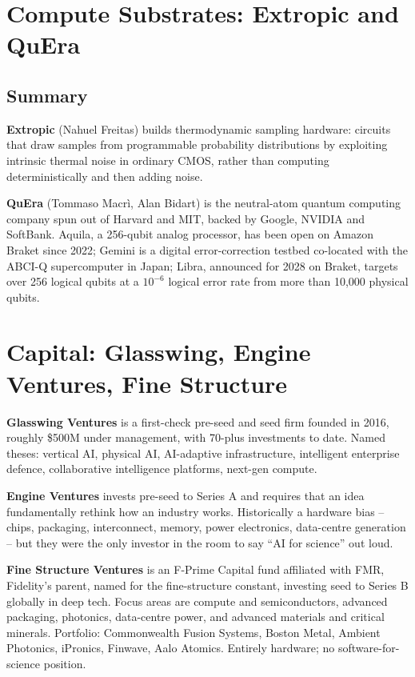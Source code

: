 \documentclass[11pt]{article}
\begin{document}
\section{Compute Substrates: Extropic and QuEra}

\subsection*{Summary}
\textbf{Extropic} (Nahuel Freitas) builds thermodynamic sampling hardware: circuits that draw samples from programmable probability distributions by exploiting intrinsic thermal noise in ordinary CMOS, rather than computing deterministically and then adding noise.

\textbf{QuEra} (Tommaso Macrì, Alan Bidart) is the neutral-atom quantum computing company spun out of Harvard and MIT, backed by Google, NVIDIA and SoftBank. Aquila, a 256-qubit analog processor, has been open on Amazon Braket since 2022; Gemini is a digital error-correction testbed co-located with the ABCI-Q supercomputer in Japan; Libra, announced for 2028 on Braket, targets over 256 logical qubits at a $10^{-6}$ logical error rate from more than 10{,}000 physical qubits.

\section{Capital: Glasswing, Engine Ventures, Fine Structure}

\textbf{Glasswing Ventures} is a first-check pre-seed and seed firm founded in 2016, roughly \$500M under management, with 70-plus investments to date. Named theses: vertical AI, physical AI, AI-adaptive infrastructure, intelligent enterprise defence, collaborative intelligence platforms, next-gen compute.

\textbf{Engine Ventures} invests pre-seed to Series A and requires that an idea fundamentally rethink how an industry works. Historically a hardware bias -- chips, packaging, interconnect, memory, power electronics, data-centre generation -- but they were the only investor in the room to say ``AI for science'' out loud.

\textbf{Fine Structure Ventures} is an F-Prime Capital fund affiliated with FMR, Fidelity's parent, named for the fine-structure constant, investing seed to Series B globally in deep tech. Focus areas are compute and semiconductors, advanced packaging, photonics, data-centre power, and advanced materials and critical minerals. Portfolio: Commonwealth Fusion Systems, Boston Metal, Ambient Photonics, iPronics, Finwave, Aalo Atomics. Entirely hardware; no software-for-science position.
\end{document}
